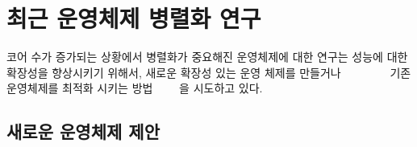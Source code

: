 
\newpage
\section{최근 운영체제 병렬화 연구}
\label{sec:osrelated}

%
 
코어 수가 증가되는 상황에서 병렬화가 중요해진 운영체제에 대한 연구는 성능에
 대한 확장성을 향상시키기 위해서, 새로운 확장성 있는
운영 체제를 만들거나 ~\cite{Boyd-WickizerCorey}~\cite{Wentzlaff2010fOS}
~\cite{Baumann2009Barrelfish}~\cite{Zellweger2014Multikernel}
~\cite{Liu2009Tessellation}~\cite{Farrington2010Helios} 
기존 운영체제를 최적화 시키는
방법~\cite{SilasBoydWickizer2010LinuxScales48}
~\cite{AustinTClements2012RCUBalancedTrees}~\cite{Clements2013RadixVM}~\cite{SilasBoydWickizerPth}을
시도하고 있다.



\subsection{새로운 운영체제 제안}




